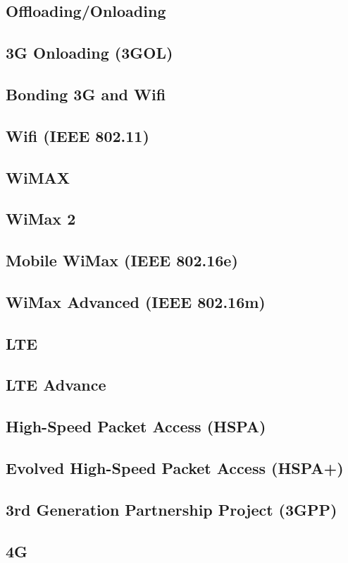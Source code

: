 \documentclass[journal]{IEEEtran}
\begin{document}
\subsection{ Offloading/Onloading }
\subsection{ 3G Onloading (3GOL) }
\subsection{ Bonding 3G and Wifi }
\subsection{ Wifi (IEEE 802.11) }
\subsection{ WiMAX }
\subsection{ WiMax 2 }
\subsection{ Mobile WiMax (IEEE 802.16e) }
\subsection{ WiMax Advanced (IEEE 802.16m) }
\subsection{ LTE }
\subsection{ LTE Advance }
\subsection{ High-Speed Packet Access (HSPA) }
\subsection{ Evolved High-Speed Packet Access (HSPA+) }
\subsection{ 3rd Generation Partnership Project (3GPP) }
\subsection{ 4G } 
\end{document}

